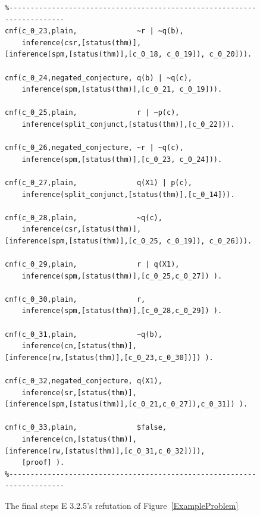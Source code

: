 \documentclass[runningheads]{llncs}
\begin{document}
\begin{figure}[htb]
\centering
{\footnotesize
{\setlength{\baselineskip}{4mm}
\begin{verbatim}
%------------------------------------------------------------------------
cnf(c_0_23,plain,              ~r | ~q(b),
    inference(csr,[status(thm)],
[inference(spm,[status(thm)],[c_0_18, c_0_19]), c_0_20])).

cnf(c_0_24,negated_conjecture, q(b) | ~q(c),
    inference(spm,[status(thm)],[c_0_21, c_0_19])).

cnf(c_0_25,plain,              r | ~p(c),
    inference(split_conjunct,[status(thm)],[c_0_22])).

cnf(c_0_26,negated_conjecture, ~r | ~q(c),
    inference(spm,[status(thm)],[c_0_23, c_0_24])).

cnf(c_0_27,plain,              q(X1) | p(c),
    inference(split_conjunct,[status(thm)],[c_0_14])).

cnf(c_0_28,plain,              ~q(c),
    inference(csr,[status(thm)],
[inference(spm,[status(thm)],[c_0_25, c_0_19]), c_0_26])).

cnf(c_0_29,plain,              r | q(X1),
    inference(spm,[status(thm)],[c_0_25,c_0_27]) ).

cnf(c_0_30,plain,              r,
    inference(spm,[status(thm)],[c_0_28,c_0_29]) ).

cnf(c_0_31,plain,              ~q(b),
    inference(cn,[status(thm)],
[inference(rw,[status(thm)],[c_0_23,c_0_30])]) ).

cnf(c_0_32,negated_conjecture, q(X1),
    inference(sr,[status(thm)],
[inference(spm,[status(thm)],[c_0_21,c_0_27]),c_0_31]) ).

cnf(c_0_33,plain,              $false,
    inference(cn,[status(thm)],
[inference(rw,[status(thm)],[c_0_31,c_0_32])]),
    [proof] ).
%------------------------------------------------------------------------
\end{verbatim}
}}
\caption{The final steps E 3.2.5's refutation of Figure~\ref{ExampleProblem}}
\label{ExampleDerivation}
\end{figure}
\end{document}
